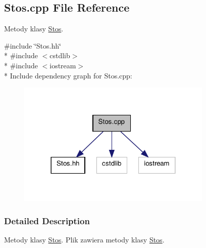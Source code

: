 \hypertarget{a00012}{\subsection{Stos.\-cpp File Reference}
\label{a00012}
}


Metody klasy \hyperlink{a00004}{Stos}.  


{\ttfamily \#include \char`\"{}Stos.\-hh\char`\"{}}\\*
{\ttfamily \#include $<$cstdlib$>$}\\*
{\ttfamily \#include $<$iostream$>$}\\*
Include dependency graph for Stos.\-cpp\-:\nopagebreak
\begin{figure}[H]
\begin{center}
\leavevmode
\includegraphics[width=264pt]{a00023}
\end{center}
\end{figure}


\subsubsection{Detailed Description}
Metody klasy \hyperlink{a00004}{Stos}. Plik zawiera metody klasy \hyperlink{a00004}{Stos}. 